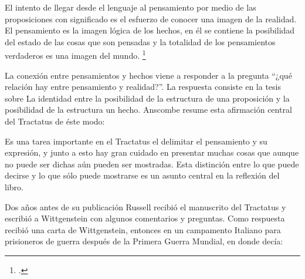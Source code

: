 El intento de llegar desde el lenguaje al pensamiento por medio de las
proposiciones con significado es el esfuerzo de conocer una imagen de la
realidad. El pensamiento es la imagen lógica de los hechos, en él se contiene la
posibilidad del estado de las cosas que son pensadas y la totalidad de los
pensamientos verdaderos es una imagen del mundo. \footcite[cf. 3 y
3.001]{tractatus}


La conexión entre pensamientos y
hechos viene a responder a la pregunta ``¿qué relación hay entre pensamiento y
realidad?''. La respuesta consiste en la tesis sobre La identidad entre la
posibilidad de la estructura de una proposición y la posibilidad de la
estructura un hecho. Anscombe resume esta afirmación central del Tractatus de éste modo:


Es una tarea importante en el Tractatus el delimitar el pensamiento y su
expresión, y junto a esto hay gran cuidado en presentar muchas cosas que aunque
no puede ser dichas aún pueden ser mostradas. Esta distinción entre lo que puede
decirse y lo que sólo puede mostrarse es un asunto central en la reflexión del
libro. 

Dos años antes de su publicación Russell recibió el manuscrito del Tractatus y
escribió a Wittgenstein con algunos comentarios y preguntas. Como respuesta
recibió una carta de Wittgenstein, entonces en un campamento Italiano para
prisioneros de guerra después de la Primera Guerra Mundial, en donde decía:

